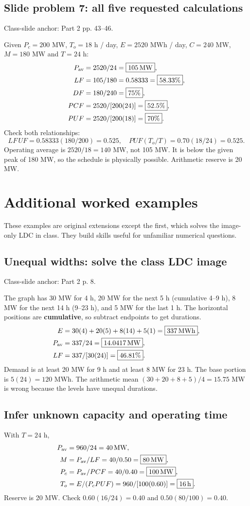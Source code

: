 \documentclass[11pt,a4paper]{article}
\newenvironment{Worked}[1]{\begin{tcolorbox}[breakable=false,colback=white,colframe=teal,colbacktitle=pale,coltitle=ink,title={#1}]}{\end{tcolorbox}}
\newcommand{\slides}[1]{{\small\color{muted}\textsf{Class-slide anchor: #1.}}\par}
\newcommand{\chapterstart}[2]{\clearpage\section{#1}\label{#2}}
\begin{document}
\subsection{Slide problem 7: all five requested calculations}
\slides{Part 2 pp. 43--46}
Given $P_c=200$ MW, $T_o=18$ h / day, $E=2520$ MWh / day, $C=240$ MW, $M=180$ MW and $T=24$ h:
\begin{align*}
P_{\rm av}&=2520/24=\boxed{105\,\mathrm{MW}},\\
LF&=105/180=0.58333=\boxed{58.33\%},\\
DF&=180/240=\boxed{75\%},\\
PCF&=2520/[200(24)]=\boxed{52.5\%},\\
PUF&=2520/[200(18)]=\boxed{70\%}.
\end{align*}
Check both relationships:
\[
LF\,UF=0.58333(180/200)=0.525,
\quad PUF(T_o / T)=0.70(18/24)=0.525.
\]
Operating average is $2520/18=140$ MW, not 105 MW. It is below the given peak of 180 MW, so the schedule is physically possible. Arithmetic reserve is 20 MW.

\chapterstart{Additional worked examples}{extraexamples}
These examples are original extensions except the first, which solves the image-only LDC in class. They build skills useful for unfamiliar numerical questions.

\subsection{Unequal widths: solve the class LDC image}
\slides{Part 2 p. 8}
The graph has 30 MW for 4 h, 20 MW for the next 5 h (cumulative 4--9 h), 8 MW for the next 14 h (9--23 h), and 5 MW for the last 1 h. The horizontal positions are \textbf{cumulative}, so subtract endpoints to get durations.
\begin{align*}
E&=30(4)+20(5)+8(14)+5(1)=\boxed{337\,\mathrm{MWh}},\\
P_{\rm av}&=337/24=\boxed{14.0417\,\mathrm{MW}},\\
LF&=337/[30(24)]=\boxed{46.81\%}.
\end{align*}
Demand is at least 20 MW for 9 h and at least 8 MW for 23 h. The base portion is $5(24)=120$ MWh. The arithmetic mean $(30+20+8+5)/4=15.75$ MW is wrong because the levels have unequal durations.

\subsection{Infer unknown capacity and operating time}
\begin{Worked}{Data: daily energy 960 MWh, $LF=0.50$, $PCF=0.40$, $PUF=0.60$}
With $T=24$ h,
\begin{align*}
P_{\rm av}&=960/24=40\,\mathrm{MW},\\
M&=P_{\rm av}/LF=40/0.50=\boxed{80\,\mathrm{MW}},\\
P_c&=P_{\rm av}/PCF=40/0.40=\boxed{100\,\mathrm{MW}},\\
T_o&=E/(P_cPUF)=960/[100(0.60)]=\boxed{16\,\mathrm{h}}.
\end{align*}
Reserve is 20 MW. Check $0.60(16/24)=0.40$ and $0.50(80/100)=0.40$.
\end{Worked}
\end{document}
